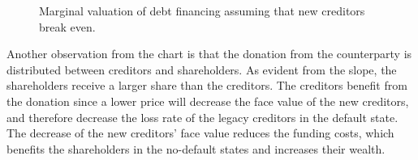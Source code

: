 \documentclass[main.tex]{subfiles}
\begin{document}
        \begin{figure}
            \centering
            \resizebox{\textwidth}{!}{%
                
            }
            \caption{
                Marginal valuation of debt financing 
                assuming that new creditors break even.
            }
            \label{fig:marginal-value-debt-financing}
        \end{figure}

        Another observation from the chart is that the donation from the counterparty 
        is distributed between creditors and shareholders.
        As evident from the slope, the shareholders receive a larger share than the creditors.
        The creditors benefit from the donation since a lower price will
        decrease the face value of the new creditors, and therefore decrease the loss rate
        of the legacy creditors in the default state.
        The decrease of the new creditors' face value reduces the funding costs,
        which benefits the shareholders in the no-default states and increases their wealth.  
\end{document}
